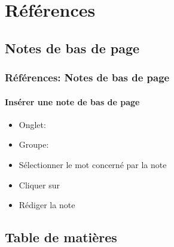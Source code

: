 \documentclass[xcolor=table]{beamer}
\begin{document}
\section{Références}

%

\subsection{Notes de bas de page}

\begin{frame}[t]
\frametitle{Références: Notes de bas de page}
\framesubtitle{Insérer une note de bas de page}

\begin{minipage}{0.69\textwidth}
\begin{itemize}
	\item Onglet: 
	\item Groupe: 
\end{itemize}
\end{minipage}
\begin{minipage}{0.30\textwidth}
\end{minipage}

\begin{itemize}
	\item Sélectionner le mot concerné par la note
	\item Cliquer sur 
	\item Rédiger la note
\end{itemize}

\end{frame}

\subsection{Table de matières}
\end{document}
